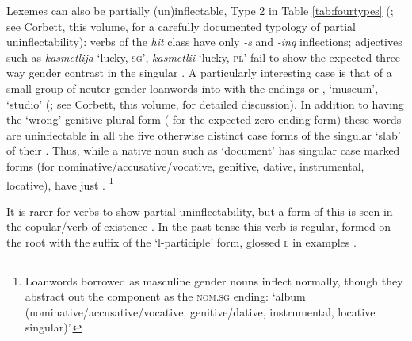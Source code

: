 \documentclass[output=paper,colorlinks,citecolor=brown]{langscibook}
\begin{document}
Lexemes can also be partially (un)inflectable, Type 2 in  Table \ref{tab:fourtypes} (\citealp[26]{baermanbrowncorbett2015}; see Corbett, this volume, for a carefully documented typology of partial uninflectability):   verbs of the  \textit{hit} class have only \textit{-s} and \textit{-ing} inflections;  adjectives such as \textit{kasmetlija} ‘lucky, \textsc{sg}’, \textit{kasmetlii} ‘lucky, \textsc{pl}’ fail to show the expected three-way gender contrast  in the singular \citep{friedman1993}. A particularly interesting case is that of a small group of neuter gender  loanwords into  with the endings \mbox{} or \mbox{},  `museum', \label{muzeum}  `studio' (\citealp[118]{swan2002}; see  Corbett, this volume, for detailed discussion). In addition to having the `wrong' genitive plural form ( for the expected zero ending form) these words are uninflectable in all the five otherwise distinct case forms of the singular `slab' of their . Thus, while a native noun such as  `document' has singular case marked forms  (for nominative/accusative/vocative, genitive, dative, instrumental, locative),  have just .%
\footnote{%
	Loanwords borrowed as masculine gender nouns inflect normally, though they abstract out the  component as the \textsc{nom.sg} ending:  `album (nominative/accusative/vocative, genitive/dative, instrumental, locative singular)'. 
} %

It is rarer for verbs to show partial uninflectability, but a form of this is seen in the  copular/verb of existence . In the past tense this verb is regular, formed on the root  with the  suffix of the `l-participle' form, glossed \textsc{l} in examples .  
\end{document}
